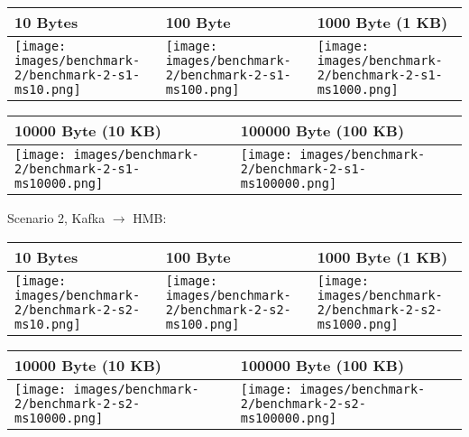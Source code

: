 \begin{table}[H]
\centering
\begin{tabular}{|l|l|l|} \hline
10 Bytes & 100 Byte & 1000 Byte (1 KB)\\ \hline
\texttt{[image: images/benchmark-2/benchmark-2-s1-ms10.png]}
&
\texttt{[image: images/benchmark-2/benchmark-2-s1-ms100.png]}
&
\texttt{[image: images/benchmark-2/benchmark-2-s1-ms1000.png]} \\ \hline
\end{tabular}
\end{table}

\begin{table}[H]
\centering
\begin{tabular}{|l|l|} \hline
10000 Byte (10 KB) & 100000 Byte (100 KB)\\ \hline
\texttt{[image: images/benchmark-2/benchmark-2-s1-ms10000.png]}
&
\texttt{[image: images/benchmark-2/benchmark-2-s1-ms100000.png]} \\ \hline
\end{tabular}
\end{table}

Scenario 2, Kafka $\rightarrow$ HMB:

\begin{table}[H]
\centering
\begin{tabular}{|l|l|l|} \hline
10 Bytes & 100 Byte & 1000 Byte (1 KB)\\ \hline
\texttt{[image: images/benchmark-2/benchmark-2-s2-ms10.png]}
&
\texttt{[image: images/benchmark-2/benchmark-2-s2-ms100.png]}
&
\texttt{[image: images/benchmark-2/benchmark-2-s2-ms1000.png]} \\ \hline
\end{tabular}
\end{table}

\begin{table}[H]
\centering
\begin{tabular}{|l|l|} \hline
10000 Byte (10 KB) & 100000 Byte (100 KB)\\ \hline
\texttt{[image: images/benchmark-2/benchmark-2-s2-ms10000.png]}
&
\texttt{[image: images/benchmark-2/benchmark-2-s2-ms100000.png]} \\ \hline
\end{tabular}
\end{table}

